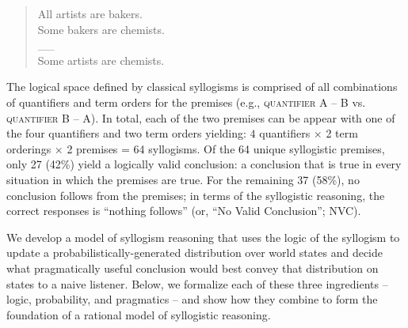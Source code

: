 \documentclass[floatsintext, doc]{apa6}
\begin{document}
\begin{quote}
All artists are bakers. \\
Some bakers are chemists. \\
\_\_ \\
Some artists are chemists.
\end{quote}

The logical space defined by classical syllogisms is comprised of all combinations of quantifiers and term orders for the premises (e.g., \textsc{quantifier} \textsc{A} -- \textsc{B} vs. \textsc{quantifier} \textsc{B} -- \textsc{A}).
In total, each of the two premises can be appear with one of the four quantifiers and two term orders yielding:  $4$ quantifiers  $\times$ 2 term orderings $\times$ 2 premises = 64 syllogisms.
Of the 64 unique syllogistic premises, only 27  (42\%) yield a logically valid conclusion: a conclusion that is true in every situation in which the premises are true.
For the remaining 37 (58\%), no conclusion follows from the premises; in terms of the syllogistic reasoning, the correct responses is ``nothing follows'' (or, ``No Valid Conclusion''; NVC). 



We develop a model of syllogism reasoning that uses the logic of the syllogism to update a probabilistically-generated distribution over world states and decide what pragmatically useful conclusion would best convey that distribution on states to a naive listener.
Below, we formalize each of these three ingredients --  logic, probability, and pragmatics -- and show how they combine to form the foundation of a rational model of syllogistic reasoning. 

\end{document}
